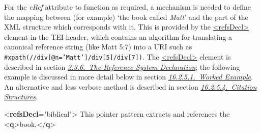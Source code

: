 For the {\itshape cRef} attribute to function as required, a mechanism is needed to define the mapping between (for example) ‘the book called \textit{Matt}’ and the part of the XML structure which corresponds with it. This is provided by the \hyperref[TEI.refsDecl]{<refsDecl>} element  in the TEI header, which contains an algorithm for translating a canonical reference string (like Matt 5:7) into a URI such as \texttt{\#xpath(//div[@n='Matt']/div[5]/div[7])}. The \hyperref[TEI.refsDecl]{<refsDecl>} element is described in section \textit{\hyperref[HD54]{2.3.6.\ The Reference System Declaration}}; the following example is discussed in more detail below in section \textit{\hyperref[SACRWE]{16.2.5.1.\ Worked Example}}. An alternative and less verbose method is described in section \textit{\hyperref[SACRCS]{16.2.5.4.\ Citation Structures}}. \par\bgroup{}\exampleFont \begin{shaded}\noindent\mbox{}{<\textbf{refsDecl}\hspace*{1em}{xml:id}="{biblical}">}\mbox{}\newline 
{}\mbox{}\newline 
\hspace*{1em}This pointer pattern extracts and references the {<\textbf{q}>}book,{</\textbf{q}>}\mbox{}\newline 

\end{shaded}
